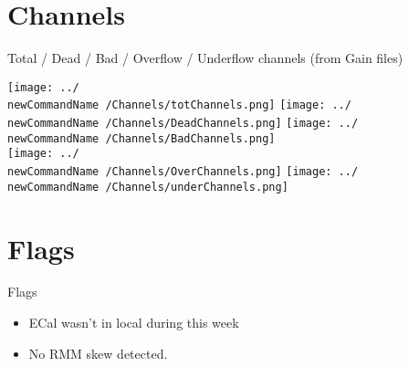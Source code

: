 \documentclass{beamer}
\newcommand{\newCommandName}{0522-0528}
\begin{document}
\section{Channels}
\begin{frame}{Total / Dead / Bad / Overflow / Underflow channels (from Gain files)}
  \begin{center}
    \texttt{[image: ../\\newCommandName /Channels/totChannels.png]}
    \hspace{0.2cm}
    \texttt{[image: ../\\newCommandName /Channels/DeadChannels.png]}
    \hspace{0.2cm}
    \texttt{[image: ../\\newCommandName /Channels/BadChannels.png]} \\
    \vspace{0.2cm}
    \texttt{[image: ../\\newCommandName /Channels/OverChannels.png]}
    \hspace{0.5cm}
    \texttt{[image: ../\\newCommandName /Channels/underChannels.png]}
  \end{center}
\end{frame}
\section{Flags} 
\begin{frame}{Flags}
  \begin{center}
    \begin{itemize}
    \item ECal wasn't in local during this week
    \item No RMM skew detected.
    \end{itemize}
  \end{center}
\end{frame}
\end{document}
